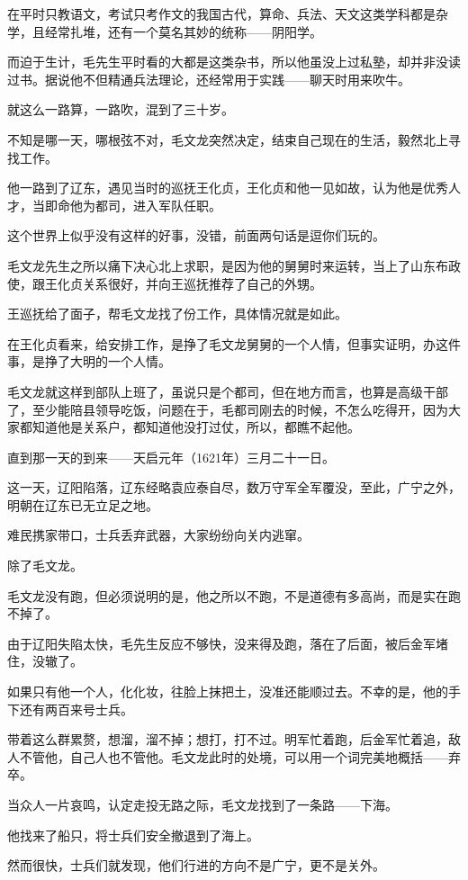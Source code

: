 \begin{multicols}{\theparacolNo}
在平时只教语文，考试只考作文的我国古代，算命、兵法、天文这类学科都是杂学，且经常扎堆，还有一个莫名其妙的统称——阴阳学。

而迫于生计，毛先生平时看的大都是这类杂书，所以他虽没上过私塾，却并非没读过书。据说他不但精通兵法理论，还经常用于实践——聊天时用来吹牛。

就这么一路算，一路吹，混到了三十岁。

不知是哪一天，哪根弦不对，毛文龙突然决定，结束自己现在的生活，毅然北上寻找工作。

他一路到了辽东，遇见当时的巡抚王化贞，王化贞和他一见如故，认为他是优秀人才，当即命他为都司，进入军队任职。

这个世界上似乎没有这样的好事，没错，前面两句话是逗你们玩的。

毛文龙先生之所以痛下决心北上求职，是因为他的舅舅时来运转，当上了山东布政使，跟王化贞关系很好，并向王巡抚推荐了自己的外甥。

王巡抚给了面子，帮毛文龙找了份工作，具体情况就是如此。

在王化贞看来，给安排工作，是挣了毛文龙舅舅的一个人情，但事实证明，办这件事，是挣了大明的一个人情。

毛文龙就这样到部队上班了，虽说只是个都司，但在地方而言，也算是高级干部了，至少能陪县领导吃饭，问题在于，毛都司刚去的时候，不怎么吃得开，因为大家都知道他是关系户，都知道他没打过仗，所以，都瞧不起他。

直到那一天的到来——天启元年（1621年）三月二十一日。

这一天，辽阳陷落，辽东经略袁应泰自尽，数万守军全军覆没，至此，广宁之外，明朝在辽东已无立足之地。

难民携家带口，士兵丢弃武器，大家纷纷向关内逃窜。

除了毛文龙。

毛文龙没有跑，但必须说明的是，他之所以不跑，不是道德有多高尚，而是实在跑不掉了。

由于辽阳失陷太快，毛先生反应不够快，没来得及跑，落在了后面，被后金军堵住，没辙了。

如果只有他一个人，化化妆，往脸上抹把土，没准还能顺过去。不幸的是，他的手下还有两百来号士兵。

带着这么群累赘，想溜，溜不掉；想打，打不过。明军忙着跑，后金军忙着追，敌人不管他，自己人也不管他。毛文龙此时的处境，可以用一个词完美地概括——弃卒。

当众人一片哀鸣，认定走投无路之际，毛文龙找到了一条路——下海。

他找来了船只，将士兵们安全撤退到了海上。

然而很快，士兵们就发现，他们行进的方向不是广宁，更不是关外。


\end{multicols}
